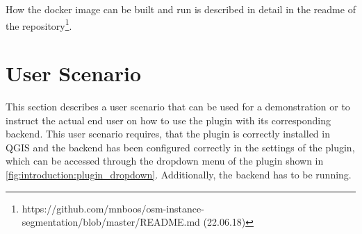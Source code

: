 How the docker image can be built and run is described in detail in the readme of the repository\footnote{https://github.com/mnboos/osm-instance-segmentation/blob/master/README.md (22.06.18)}.

\section{User Scenario}
This section describes a user scenario that can be used for a demonstration or to instruct the actual end user on how to use the plugin with its corresponding backend. This user scenario requires, that the plugin is correctly installed in QGIS and the backend has been configured correctly in the settings of the plugin, which can be accessed through the dropdown menu of the plugin shown in \autoref{fig:introduction:plugin_dropdown}. Additionally, the backend has to be running.
